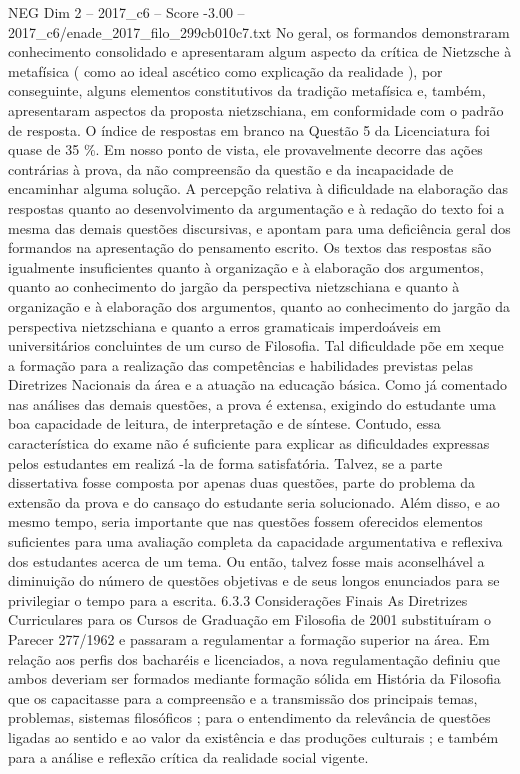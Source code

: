 \begin{textsample}{NEG Dim 2 – 2017\_c6 – Score -3.00 – 2017\_c6/enade\_2017\_filo\_299cb010c7.txt}
No geral, os formandos demonstraram conhecimento consolidado e apresentaram algum aspecto da crítica de Nietzsche à metafísica ( como ao ideal ascético como explicação da realidade ), por conseguinte, alguns elementos constitutivos da tradição metafísica e, também, apresentaram aspectos da proposta nietzschiana, em conformidade com o padrão de resposta.
O índice de respostas em branco na Questão 5 da Licenciatura foi quase de 35 \%.
Em nosso ponto de vista, ele provavelmente decorre das ações contrárias à prova, da não compreensão da questão e da incapacidade de encaminhar alguma solução.
A percepção relativa à dificuldade na elaboração das respostas quanto ao desenvolvimento da argumentação e à redação do texto foi a mesma das demais questões discursivas, e apontam para uma deficiência geral dos formandos na apresentação do pensamento escrito.
Os textos das respostas são igualmente insuficientes quanto à organização e à elaboração dos argumentos, quanto ao conhecimento do jargão da perspectiva nietzschiana e quanto à organização e à elaboração dos argumentos, quanto ao conhecimento do jargão da perspectiva nietzschiana e quanto a erros gramaticais imperdoáveis em universitários concluintes de um curso de Filosofia.
Tal dificuldade põe em xeque a formação para a realização das competências e habilidades previstas pelas Diretrizes Nacionais da área e a atuação na educação básica.
Como já comentado nas análises das demais questões, a prova é extensa, exigindo do estudante uma boa capacidade de leitura, de interpretação e de síntese.
Contudo, essa característica do exame não é suficiente para explicar as dificuldades expressas pelos estudantes em realizá -la de forma satisfatória.
Talvez, se a parte dissertativa fosse composta por apenas duas questões, parte do problema da extensão da prova e do cansaço do estudante seria solucionado.
Além disso, e ao mesmo tempo, seria importante que nas questões fossem oferecidos elementos suficientes para uma avaliação completa da capacidade argumentativa e reflexiva dos estudantes acerca de um tema.
Ou então, talvez fosse mais aconselhável a diminuição do número de questões objetivas e de seus longos enunciados para se privilegiar o tempo para a escrita. 6.3.3 Considerações Finais As Diretrizes Curriculares para os Cursos de Graduação em Filosofia de 2001 substituíram o Parecer 277/1962 e passaram a regulamentar a formação superior na área.
Em relação aos perfis dos bacharéis e licenciados, a nova regulamentação definiu que ambos deveriam ser formados mediante formação sólida em História da Filosofia que os capacitasse para a compreensão e a transmissão dos principais temas, problemas, sistemas filosóficos ; para o entendimento da relevância de questões ligadas ao sentido e ao valor da existência e das produções culturais ; e também para a análise e reflexão crítica da realidade social vigente.

\end{textsample}
